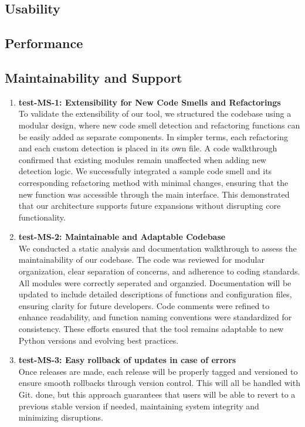 \documentclass[12pt, titlepage]{article}
\begin{document}
\subsection{Usability}
		
\subsection{Performance}

\subsection{Maintainability and Support}
\begin{enumerate}

\item \textbf{test-MS-1: Extensibility for New Code Smells and Refactorings} \\[2mm]
To validate the extensibility of our tool, we structured the codebase using a modular design, where new code smell detection and refactoring functions can 
be easily added as separate components. In simpler terms, each refactoring and each custom detection is placed in its own file. A code walkthrough confirmed that 
existing modules remain unaffected when adding new detection logic. We successfully integrated a sample code smell and its corresponding refactoring method with 
minimal changes, ensuring that the new function was accessible through the main interface. This demonstrated that our architecture supports future expansions without 
disrupting core functionality.

\item \textbf{test-MS-2: Maintainable and Adaptable Codebase} \\[2mm]
We conducted a static analysis and documentation walkthrough to assess the maintainability of our codebase. The code was reviewed for modular organization, clear separation 
of concerns, and adherence to coding standards. All modules were correctly seperated and organzied. Documentation will be updated to include detailed descriptions of functions 
and configuration files, ensuring clarity for future developers. Code comments were refined to enhance readability, and function naming conventions were standardized for 
consistency. These efforts ensured that the tool remains adaptable to new Python versions and evolving best practices.

\item \textbf{test-MS-3: Easy rollback of updates in case of errors} \\[2mm]
Once releases are made, each release will be properly tagged and versioned to ensure smooth rollbacks through version control. This will all be handled with Git. done, but 
this approach guarantees that users will be able to revert to a previous stable version if needed, maintaining system integrity and minimizing disruptions.
\end{enumerate}
\end{document}
